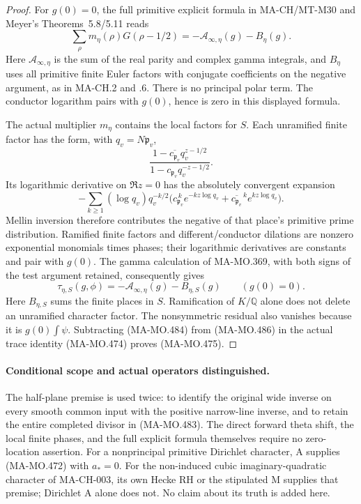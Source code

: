 \begin{proof}
For \(g(0)=0\), the full primitive explicit formula in
MA-CH/MT-M30 and Meyer's Theorems~5.8/5.11 reads
\[
       \sum_\rho m_\eta(\rho)G(\rho-1/2)
                   =-\mathcal A_{\infty,\eta}(g)-B_\eta(g).
 \tag{MA-MO.484}
\]
Here \(\mathcal A_{\infty,\eta}\) is the sum of the real
parity and complex gamma integrals, and \(B_\eta\) uses
all primitive finite Euler factors with conjugate coefficients
on the negative argument, as in MA-CH.2 and .6. There is
no principal polar term. The conductor logarithm pairs
with \(g(0)\), hence is zero in this displayed formula.

The actual multiplier \(m_\eta\) contains the local
factors for \(S\). Each unramified finite factor has the
form, with \(q_v=N\mathfrak p_v\),
\[
       \frac{1-\overline{c_{\mathfrak p_v}}q_v^{z-1/2}}
            {1-c_{\mathfrak p_v}q_v^{-z-1/2}}.
 \tag{MA-MO.485}
\]
Its logarithmic derivative on \(\Re z=0\) has the
absolutely convergent expansion
\[
 -\sum_{k\ge1}(\log q_v)q_v^{-k/2}
 \bigl(c_{\mathfrak p_v}^{\,k}e^{-kz\log q_v}
  +\overline{c_{\mathfrak p_v}}^{\,k}e^{kz\log q_v}\bigr).
\]
Mellin inversion therefore contributes the negative of
that place's primitive prime distribution. Ramified finite
factors and different/conductor dilations are nonzero
exponential monomials times phases; their logarithmic
derivatives are constants and pair with \(g(0)\).
The gamma calculation of MA-MO.369, with both signs of
the test argument retained, consequently gives
\[
        \tau_{\eta,S}(g,\phi)
          =-\mathcal A_{\infty,\eta}(g)-B_{\eta,S}(g)
                            \qquad(g(0)=0).
 \tag{MA-MO.486}
\]
Here \(B_{\eta,S}\) sums the finite places in \(S\).
Ramification of \(K/\mathbb Q\) alone does not delete
an unramified character factor. The nonsymmetric residual
also vanishes because it is \(g(0)\int\psi\).
Subtracting (MA-MO.484) from (MA-MO.486) in the actual
trace identity (MA-MO.474) proves (MA-MO.475).
\end{proof}

\paragraph{Conditional scope and actual operators distinguished.}
The half-plane premise is used twice: to identify the
original wide inverse on every smooth common input with
the positive narrow-line inverse, and to retain the entire
completed divisor in (MA-MO.483). The direct forward
theta shift, the local finite phases, and the full explicit
formula themselves require no zero-location assertion.
For a nonprincipal primitive Dirichlet character, A supplies
(MA-MO.472) with \(a_*=0\). For the non-induced cubic
imaginary-quadratic character of MA-CH-003, its own Hecke RH
or the stipulated M supplies that premise; Dirichlet A
alone does not. No claim about its truth is added here.

